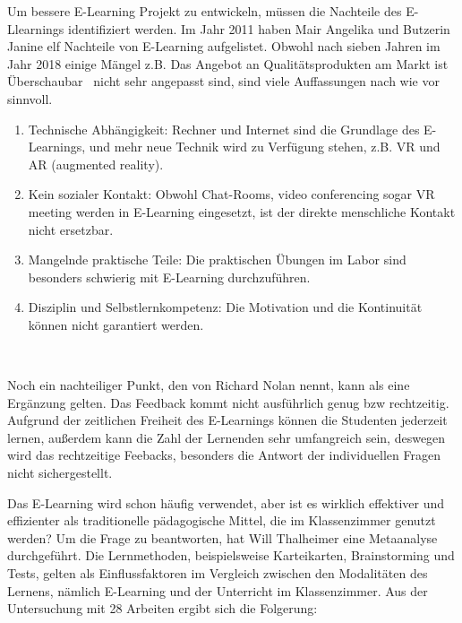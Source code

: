 Um bessere E-Learning Projekt zu entwickeln, müssen die Nachteile des E-Llearnings identifiziert werden. Im Jahr 2011 haben Mair Angelika und Butzerin Janine \citep{7} elf Nachteile von E-Learning aufgelistet. Obwohl nach sieben Jahren im Jahr 2018 einige Mängel z.B. \glqq Das Angebot an Qualitätsprodukten am Markt ist Überschaubar \grqq\ nicht sehr angepasst sind, sind viele Auffassungen nach wie vor sinnvoll.

\begin{enumerate}
\item Technische Abhängigkeit: Rechner und Internet sind die Grundlage des E-Learnings, und mehr neue Technik wird zu Verfügung stehen, z.B. VR und AR (augmented reality).
\item Kein sozialer Kontakt: Obwohl Chat-Rooms, video conferencing sogar VR meeting werden in E-Learning eingesetzt, ist der direkte menschliche Kontakt nicht ersetzbar.
\item Mangelnde praktische Teile: Die praktischen Übungen im Labor sind besonders schwierig mit E-Learning durchzuführen.
\item Disziplin und Selbstlernkompetenz: Die Motivation und die Kontinuität können nicht garantiert werden.
\end{enumerate}\

Noch ein nachteiliger Punkt, den von Richard Nolan \citep{5} nennt, kann als eine Ergänzung gelten. Das Feedback kommt nicht ausführlich genug bzw rechtzeitig. Aufgrund der zeitlichen Freiheit des E-Learnings können die Studenten jederzeit lernen, außerdem kann die Zahl der Lernenden sehr umfangreich sein, deswegen wird das rechtzeitige Feebacks, besonders die Antwort der individuellen Fragen nicht sichergestellt.

Das E-Learning wird schon häufig verwendet, aber ist es wirklich effektiver und effizienter als traditionelle pädagogische Mittel, die im Klassenzimmer genutzt werden? Um die Frage zu beantworten, hat Will Thalheimer \citep{8} eine Metaanalyse durchgeführt. Die Lernmethoden, beispielsweise Karteikarten, Brainstorming und Tests, gelten als Einflussfaktoren im Vergleich zwischen den Modalitäten des Lernens, nämlich E-Learning und der Unterricht im Klassenzimmer. Aus der Untersuchung mit 28 Arbeiten ergibt sich die Folgerung:

